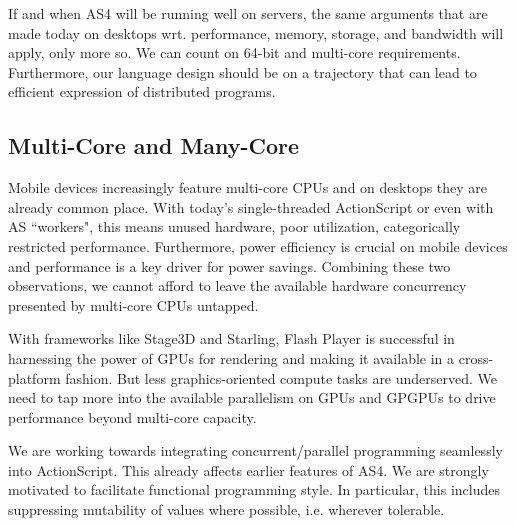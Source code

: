 If and when AS4 will be running well on servers, the same arguments that are
made today on desktops wrt. performance, memory, storage, and bandwidth will
apply, only more so.
We can count on 64-bit and multi-core requirements. Furthermore, our language
design should be on a trajectory that can lead to efficient expression of distributed
programs.

\subsection{Multi-Core and Many-Core}
Mobile devices increasingly feature multi-core CPUs and on desktops they are
already common place. With today's single-threaded ActionScript or even with AS
``workers", this means unused hardware, poor utilization, categorically
restricted performance. Furthermore, power efficiency is crucial on mobile
devices and performance is a key driver for power savings. Combining these two
observations, we cannot afford to leave the available hardware concurrency
presented by multi-core CPUs untapped.

With frameworks like Stage3D and Starling, Flash Player is successful in
harnessing the power of GPUs for rendering and making it available in a cross-platform fashion.
But less graphics-oriented compute tasks are underserved. We need to tap more
into the available parallelism on GPUs and GPGPUs to drive performance beyond
multi-core capacity.

We are working towards integrating concurrent/parallel programming seamlessly
into ActionScript. This already affects earlier features of AS4. We are strongly
motivated to facilitate functional programming style. In particular, this
includes suppressing mutability of values where possible, i.e. wherever
tolerable.

